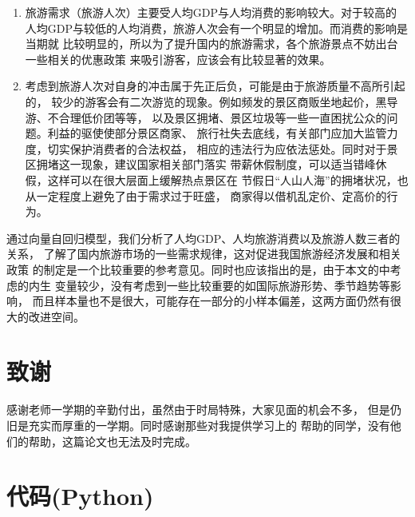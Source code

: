 \documentclass{article}
\begin{document}
    \begin{enumerate}
        \item
        旅游需求（旅游人次）主要受人均GDP与人均消费的影响较大。对于较高的
        人均GDP与较低的人均消费，旅游人次会有一个明显的增加。而消费的影响是当期就
        比较明显的，所以为了提升国内的旅游需求，各个旅游景点不妨出台一些相关的优惠政策
        来吸引游客，应该会有比较显著的效果。

        \item

        考虑到旅游人次对自身的冲击属于先正后负，可能是由于旅游质量不高所引起的，
        较少的游客会有二次游览的现象。例如频发的景区商贩坐地起价，黑导游、不合理低价团等等，
        以及景区拥堵、景区垃圾等一些一直困扰公众的问题。利益的驱使使部分景区商家、
        旅行社失去底线，有关部门应加大监管力度，切实保护消费者的合法权益，
        相应的违法行为应依法惩处。同时对于景区拥堵这一现象，建议国家相关部门落实
        带薪休假制度，可以适当错峰休假，这样可以在很大层面上缓解热点景区在
        节假日“人山人海”的拥堵状况，也从一定程度上避免了由于需求过于旺盛，
        商家得以借机乱定价、定高价的行为。
    \end{enumerate}

    通过向量自回归模型，我们分析了人均GDP、人均旅游消费以及旅游人数三者的关系，
    了解了国内旅游市场的一些需求规律，这对促进我国旅游经济发展和相关政策
    的制定是一个比较重要的参考意见。同时也应该指出的是，由于本文的中考虑的内生
    变量较少，没有考虑到一些比较重要的如国际旅游形势、季节趋势等影响，
    而且样本量也不是很大，可能存在一部分的小样本偏差，这两方面仍然有很大的改进空间。

    
    

    \newpage
    \section{致谢}
    感谢老师一学期的辛勤付出，虽然由于时局特殊，大家见面的机会不多，
    但是仍旧是充实而厚重的一学期。同时感谢那些对我提供学习上的
    帮助的同学，没有他们的帮助，这篇论文也无法及时完成。

    \newpage
    \appendix
    \section{代码(Python)}
    
\end{document}
